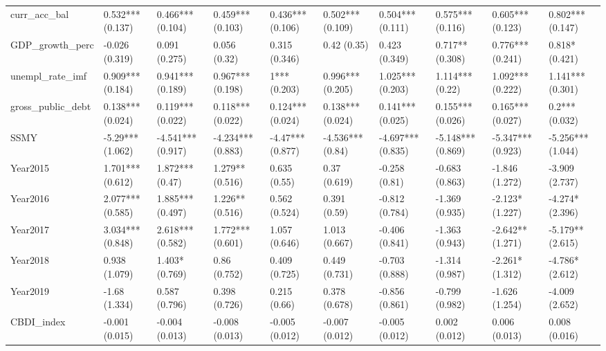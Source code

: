\begin{table}[ht]
\begin{tabular}{llllllllll}
  curr\_acc\_bal & 0.532*** (0.137) & 0.466*** (0.104) & 0.459*** (0.103) & 0.436*** (0.106) & 0.502*** (0.109) & 0.504*** (0.111) & 0.575*** (0.116) & 0.605*** (0.123) & 0.802*** (0.147) \\ 
  GDP\_growth\_perc & -0.026 (0.319) & 0.091 (0.275) & 0.056 (0.32) & 0.315 (0.346) & 0.42 (0.35) & 0.423 (0.349) & 0.717** (0.308) & 0.776*** (0.241) & 0.818* (0.421) \\ 
  unempl\_rate\_imf & 0.909*** (0.184) & 0.941*** (0.189) & 0.967*** (0.198) & 1*** (0.203) & 0.996*** (0.205) & 1.025*** (0.203) & 1.114*** (0.22) & 1.092*** (0.222) & 1.141*** (0.301) \\ 
  gross\_public\_debt & 0.138*** (0.024) & 0.119*** (0.022) & 0.118*** (0.022) & 0.124*** (0.024) & 0.138*** (0.024) & 0.141*** (0.025) & 0.155*** (0.026) & 0.165*** (0.027) & 0.2*** (0.032) \\ 
  SSMY & -5.29*** (1.062) & -4.541*** (0.917) & -4.234*** (0.883) & -4.47*** (0.877) & -4.536*** (0.84) & -4.697*** (0.835) & -5.148*** (0.869) & -5.347*** (0.923) & -5.256*** (1.044) \\ 
  Year2015 & 1.701*** (0.612) & 1.872*** (0.47) & 1.279** (0.516) & 0.635 (0.55) & 0.37 (0.619) & -0.258 (0.81) & -0.683 (0.863) & -1.846 (1.272) & -3.909 (2.737) \\ 
  Year2016 & 2.077*** (0.585) & 1.885*** (0.497) & 1.226** (0.516) & 0.562 (0.524) & 0.391 (0.59) & -0.812 (0.784) & -1.369 (0.935) & -2.123* (1.227) & -4.274* (2.396) \\ 
  Year2017 & 3.034*** (0.848) & 2.618*** (0.582) & 1.772*** (0.601) & 1.057 (0.646) & 1.013 (0.667) & -0.406 (0.841) & -1.363 (0.943) & -2.642** (1.271) & -5.179** (2.615) \\ 
  Year2018 & 0.938 (1.079) & 1.403* (0.769) & 0.86 (0.752) & 0.409 (0.725) & 0.449 (0.731) & -0.703 (0.888) & -1.314 (0.987) & -2.261* (1.312) & -4.786* (2.612) \\ 
  Year2019 & -1.68 (1.334) & 0.587 (0.796) & 0.398 (0.726) & 0.215 (0.66) & 0.378 (0.678) & -0.856 (0.861) & -0.799 (0.982) & -1.626 (1.254) & -4.009 (2.652) \\ 
  CBDI\_index & -0.001 (0.015) & -0.004 (0.013) & -0.008 (0.013) & -0.005 (0.012) & -0.007 (0.012) & -0.005 (0.012) & 0.002 (0.012) & 0.006 (0.013) & 0.008 (0.016) \\ 
   \bottomrule
\end{tabular}
\endgroup
\end{table}

